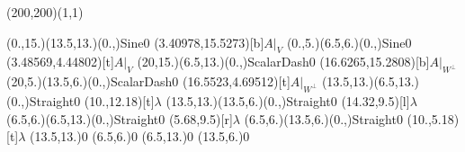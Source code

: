 \unitlength=1bp%

\begin{feynartspicture}(200,200)(1,1)

\FADiagram{}
\FAProp(0.,15.)(13.5,13.)(0.,){Sine}{0}
\FALabel(3.40978,15.5273)[b]{$A|_V$}
\FAProp(0.,5.)(6.5,6.)(0.,){Sine}{0}
\FALabel(3.48569,4.44802)[t]{$A|_V$}
\FAProp(20,15.)(6.5,13.)(0.,){ScalarDash}{0}
\FALabel(16.6265,15.2808)[b]{$A|_{W^\perp}$}
\FAProp(20,5.)(13.5,6.)(0.,){ScalarDash}{0}
\FALabel(16.5523,4.69512)[t]{$A|_{W^\perp}$}
\FAProp(13.5,13.)(6.5,13.)(0.,){Straight}{0}
\FALabel(10.,12.18)[t]{$\lambda$}
\FAProp(13.5,13.)(13.5,6.)(0.,){Straight}{0}
\FALabel(14.32,9.5)[l]{$\lambda$}
\FAProp(6.5,6.)(6.5,13.)(0.,){Straight}{0}
\FALabel(5.68,9.5)[r]{$\lambda$}
\FAProp(6.5,6.)(13.5,6.)(0.,){Straight}{0}
\FALabel(10.,5.18)[t]{$\lambda$}
\FAVert(13.5,13.){0}
\FAVert(6.5,6.){0}
\FAVert(6.5,13.){0}
\FAVert(13.5,6.){0}
\end{feynartspicture}

